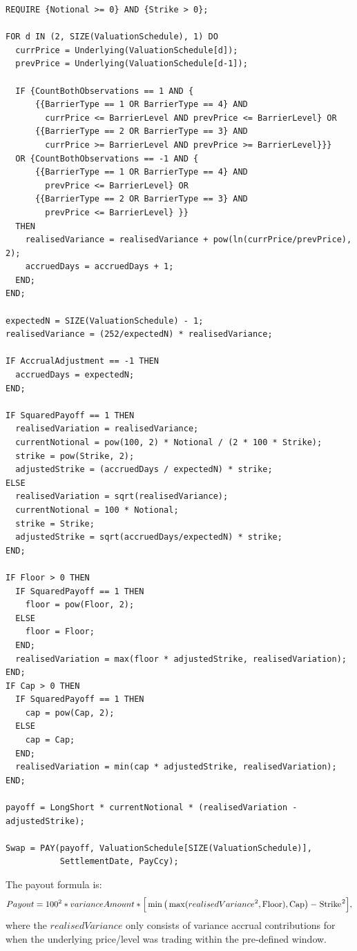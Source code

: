 \begin{listing}[hbt]
\begin{verbatim}
REQUIRE {Notional >= 0} AND {Strike > 0};

FOR d IN (2, SIZE(ValuationSchedule), 1) DO
  currPrice = Underlying(ValuationSchedule[d]);
  prevPrice = Underlying(ValuationSchedule[d-1]);

  IF {CountBothObservations == 1 AND {
      {{BarrierType == 1 OR BarrierType == 4} AND
        currPrice <= BarrierLevel AND prevPrice <= BarrierLevel} OR
      {{BarrierType == 2 OR BarrierType == 3} AND
        currPrice >= BarrierLevel AND prevPrice >= BarrierLevel}}}
  OR {CountBothObservations == -1 AND {
      {{BarrierType == 1 OR BarrierType == 4} AND
        prevPrice <= BarrierLevel} OR
      {{BarrierType == 2 OR BarrierType == 3} AND
        prevPrice <= BarrierLevel} }}
  THEN
    realisedVariance = realisedVariance + pow(ln(currPrice/prevPrice), 2);
    accruedDays = accruedDays + 1;
  END;
END;

expectedN = SIZE(ValuationSchedule) - 1;
realisedVariance = (252/expectedN) * realisedVariance;

IF AccrualAdjustment == -1 THEN
  accruedDays = expectedN;
END;

IF SquaredPayoff == 1 THEN
  realisedVariation = realisedVariance;
  currentNotional = pow(100, 2) * Notional / (2 * 100 * Strike);
  strike = pow(Strike, 2);
  adjustedStrike = (accruedDays / expectedN) * strike;
ELSE
  realisedVariation = sqrt(realisedVariance);
  currentNotional = 100 * Notional;
  strike = Strike;
  adjustedStrike = sqrt(accruedDays/expectedN) * strike;
END;

IF Floor > 0 THEN
  IF SquaredPayoff == 1 THEN
    floor = pow(Floor, 2);
  ELSE
    floor = Floor;
  END;
  realisedVariation = max(floor * adjustedStrike, realisedVariation);
END;
IF Cap > 0 THEN
  IF SquaredPayoff == 1 THEN
    cap = pow(Cap, 2);
  ELSE
    cap = Cap;
  END;
  realisedVariation = min(cap * adjustedStrike, realisedVariation);
END;

payoff = LongShort * currentNotional * (realisedVariation - adjustedStrike);

Swap = PAY(payoff, ValuationSchedule[SIZE(ValuationSchedule)],
           SettlementDate, PayCcy);
\end{verbatim}
\caption{Payoff script for a ConditionalVarianceSwap01.}
\label{lst:conditional_variance_swap_01}
\end{listing}

The payout formula is:
\begin{equation*}
  Payout = 100^2 * varianceAmount * \Big[ \min \big( \max (realisedVariance^2, \text{\lstinline!Floor!}), \text{\lstinline!Cap!}\big) - \text{\lstinline!Strike!}^2 \Big],
\end{equation*}
where the $realisedVariance$ only consists of variance accrual contributions for when the underlying price/level
was trading within the pre-defined window.

